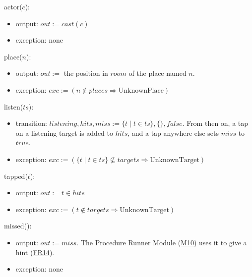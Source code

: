 \documentclass[10pt, titlepage]{article}
\newcommand{\srsurl}{https://team-hindsight.github.io/ophthamology-game/SRS/SRS.pdf}
\newcommand{\srsitemref}[2]{\href{\srsurl\#nameddest=#1}{#2}}
\newcommand{\misref}[2]{\hyperref[mis:#1]{M#2}}
\newcommand{\T}[1]{\mathit{#1}}          %
\newcommand{\out}{\mathit{out}}
\newcommand{\exc}{\mathit{exc}}
\newcommand{\true}{\mathit{true}}
\newcommand{\false}{\mathit{false}}
\begin{document}
\begin{samepage}
\noindent actor($c$):
\begin{itemize}
\item output: $\out := \T{cast}(c)$
\item exception: none
\end{itemize}
\end{samepage}
\par\pagebreak[0]

\begin{samepage}
\noindent place($n$):
\begin{itemize}
\item output: $\out :=$ the position in $\T{room}$ of the place named $n$.
\item exception: $\exc := (n \notin \T{places} \Rightarrow
  \text{UnknownPlace})$
\end{itemize}
\end{samepage}
\par\pagebreak[0]

\begin{samepage}
\noindent listen($\T{ts}$):
\begin{itemize}
\item transition: $\T{listening}, \T{hits}, \T{miss} := \{t \mid t \in
  \T{ts}\}, \{\}, \false$. From then on, a tap on a listening target is added to $\T{hits}$,
  and a tap anywhere else sets $\T{miss}$ to $\true$.
\item exception: $\exc := (\{t \mid t \in \T{ts}\} \not\subseteq \T{targets} \Rightarrow
  \text{UnknownTarget})$
\end{itemize}
\end{samepage}
\par\pagebreak[0]

\begin{samepage}
\noindent tapped($t$):
\begin{itemize}
\item output: $\out := t \in \T{hits}$
\item exception: $\exc := (t \notin \T{targets} \Rightarrow
  \text{UnknownTarget})$
\end{itemize}
\end{samepage}
\par\pagebreak[0]

\begin{samepage}
\noindent missed():
\begin{itemize}
\item output: $\out := \T{miss}$. The Procedure Runner Module (\misref{Runner}{10}) uses it to
  give a hint (\srsitemref{FR_HintOnMiss}{FR14}).
\item exception: none
\end{itemize}
\end{samepage}
\par\pagebreak[0]
\end{document}
